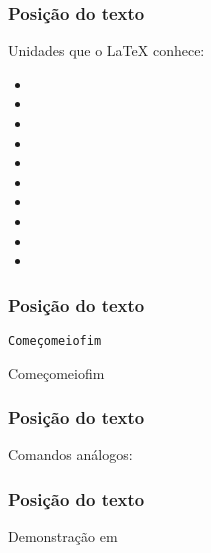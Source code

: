 \begin{frame}[fragile]
  \frametitle{Posição do texto}
  \LARGE
  Unidades que o \LaTeX{} conhece:

  \begin{multicols}{2}
    \begin{itemize}
      \item{}
      \item{}
      \item{}
      \item{}
      \item{}
      \item{}
      \item\texttt{\textheight}
      \item\texttt{\textwidth}
      \item\texttt{\pageheight}
      \item\texttt{\pageheight}
    \end{itemize}
  \end{multicols}
\end{frame}

\begin{frame}[fragile]
  \frametitle{Posição do texto}
  \LARGE
  \texttt{Começo\hfill meio\hfill fim}
  \vspace{1em}

  Começo\hfill meio\hfill fim
\end{frame}

\begin{frame}[fragile]
  \frametitle{Posição do texto}
  \LARGE
  Comandos análogos:

  \texttt{\vspace{comprimento}}
  \vspace{1em}

  \texttt{\vfill}
\end{frame}

\begin{frame}
  \frametitle{Posição do texto}
  \huge
  Demonstração em 
\end{frame}

